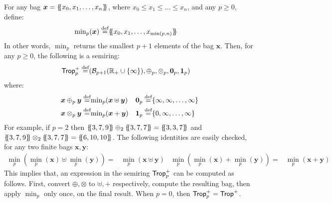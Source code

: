 \begin{ex} \label{ex:trop:p} For any bag
  $\bm x = \{\hspace{-1mm}\{x_0, x_1, \ldots, x_n\}\hspace{-1mm}\}$, where
  $x_0\leq x_1 \leq \ldots \leq x_n$, and any $p \geq 0$, define:
  \begin{align*}
    {\min}_p(\bm x) \stackrel{\text{def}}{=} & \{\hspace{-1mm}\{x_0, x_1, \ldots, x_{\min(p,n)}\}\hspace{-1mm}\}
  \end{align*}
  In other words, $\min_p$ returns the smallest $p+1$ elements of the
  bag $\bm x$.  Then, for any $p \geq 0$, the following is a semiring:
  \begin{align*}
    \text{\sf Trop}^+_p \stackrel{\text{def}}{=} & (\mathcal B_{p+1}(\mathbb R_+\cup\{\infty\}), \oplus_p, \otimes_p, \bm 0_p, \bm 1_p)
  \end{align*}
  where:
  \begin{align*}
    \bm x \oplus_p \bm y \stackrel{\text{def}}{=} & {\min}_p(\bm x \uplus \bm y) &
    \bm 0_p \stackrel{\text{def}}{=} & \{\infty, \infty, \ldots, \infty\} \\
    \bm x \otimes_p \bm y \stackrel{\text{def}}{=} & {\min}_p(\bm x + \bm y) &
    \bm 1_p \stackrel{\text{def}}{=} & \{0,\infty, \ldots, \infty\}
  \end{align*}
  For example, if $p=2$ then
  $\{\hspace{-1mm}\{3,7,9\}\hspace{-1mm}\} \oplus_2 \{\hspace{-1mm}\{3,7,7\}\hspace{-1mm}\} = \{\hspace{-1mm}\{3,3,7\}\hspace{-1mm}\}$ and
  $\{\hspace{-1mm}\{3,7,9\}\hspace{-1mm}\} \otimes_2 \{\hspace{-1mm}\{3,7,7\}\hspace{-1mm}\} = \{\hspace{-1mm}\{6,10,10\}\hspace{-1mm}\}$.
  The following identities are easily checked, for any two finite bags
  $\bm x, \bm y$:
  \begin{align}
    {\min}_p({\min}_p(\bm x) \uplus {\min}_p(\bm y))= & {\min}_p(\bm x \uplus \bm y)&
    {\min}_p({\min}_p(\bm x) + {\min}_p(\bm y))= & {\min}_p(\bm x + \bm y) \label{eq:minp:identity}
  \end{align}
  This implies that, an expression in the semiring $\text{\sf Trop}^+_p$ can be
  computed as follows.  First, convert $\oplus, \otimes$ to
  $\uplus, +$ respectively, compute the resulting bag, then apply
  $\min_p$ only once, on the final result. 
%
%
  When $p=0$, then $\text{\sf Trop}^+_p = \text{\sf Trop}^+$.
\end{ex}

